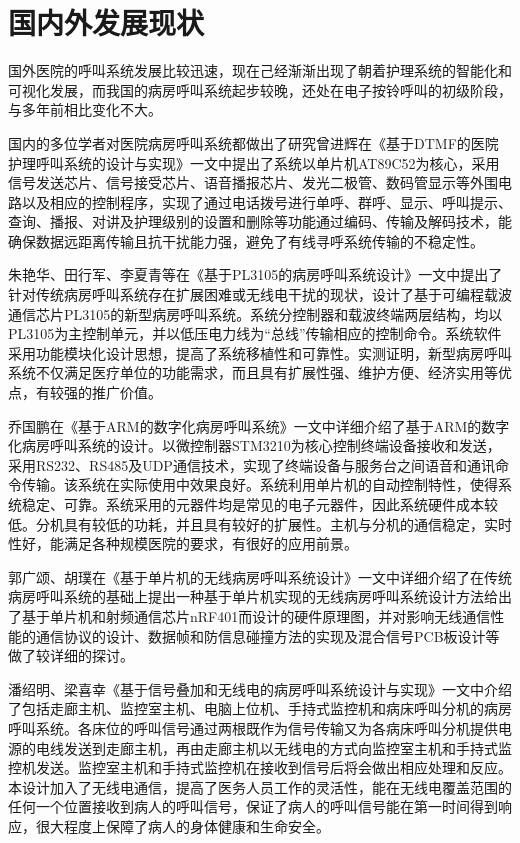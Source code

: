 \section{国内外发展现状}
国外医院的呼叫系统发展比较迅速，现在己经渐渐出现了朝着护理系统的智能化和可视化发展，而我国的病房呼叫系统起步较晚，还处在电子按铃呼叫的初级阶段，与多年前相比变化不大。

国内的多位学者对医院病房呼叫系统都做出了研究曾进辉在《基于DTMF的医院护理呼叫系统的设计与实现》一文中提出了系统以单片机AT89C52为核心，采用信号发送芯片、信号接受芯片、语音播报芯片、发光二极管、数码管显示等外围电路以及相应的控制程序，实现了通过电话拨号进行单呼、群呼、显示、呼叫提示、查询、播报、对讲及护理级别的设置和删除等功能通过编码、传输及解码技术，能确保数据远距离传输且抗干扰能力强，避免了有线寻呼系统传输的不稳定性。

朱艳华、田行军、李夏青等在《基于PL3105的病房呼叫系统设计》一文中提出了针对传统病房呼叫系统存在扩展困难或无线电干扰的现状，设计了基于可编程载波通信芯片PL3105的新型病房呼叫系统。系统分控制器和载波终端两层结构，均以PL3105为主控制单元，并以低压电力线为“总线”传输相应的控制命令。系统软件采用功能模块化设计思想，提高了系统移植性和可靠性。实测证明，新型病房呼叫系统不仅满足医疗单位的功能需求，而且具有扩展性强、维护方便、经济实用等优点，有较强的推广价值。

乔国鹏在《基于ARM的数字化病房呼叫系统》一文中详细介绍了基于ARM的数字化病房呼叫系统的设计。以微控制器STM3210为核心控制终端设备接收和发送，采用RS232、RS485及UDP通信技术，实现了终端设备与服务台之间语音和通讯命令传输。该系统在实际使用中效果良好。系统利用单片机的自动控制特性，使得系统稳定、可靠。系统采用的元器件均是常见的电子元器件，因此系统硬件成本较低。分机具有较低的功耗，并且具有较好的扩展性。主机与分机的通信稳定，实时性好，能满足各种规模医院的要求，有很好的应用前景。

郭广颂、胡璞在《基于单片机的无线病房呼叫系统设计》一文中详细介绍了在传统病房呼叫系统的基础上提出一种基于单片机实现的无线病房呼叫系统设计方法给出了基于单片机和射频通信芯片nRF401而设计的硬件原理图，并对影响无线通信性能的通信协议的设计、数据帧和防信息碰撞方法的实现及混合信号PCB板设计等做了较详细的探讨。

潘绍明、梁喜幸《基于信号叠加和无线电的病房呼叫系统设计与实现》一文中介绍了包括走廊主机、监控室主机、电脑上位机、手持式监控机和病床呼叫分机的病房呼叫系统。各床位的呼叫信号通过两根既作为信号传输又为各病床呼叫分机提供电源的电线发送到走廊主机，再由走廊主机以无线电的方式向监控室主机和手持式监控机发送。监控室主机和手持式监控机在接收到信号后将会做出相应处理和反应。本设计加入了无线电通信，提高了医务人员工作的灵活性，能在无线电覆盖范围的任何一个位置接收到病人的呼叫信号，保证了病人的呼叫信号能在第一时间得到响应，很大程度上保障了病人的身体健康和生命安全。

